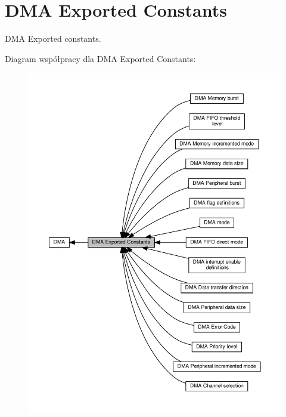 \hypertarget{group___d_m_a___exported___constants}{}\section{D\+MA Exported Constants}
\label{group___d_m_a___exported___constants}


D\+MA Exported constants.  


Diagram współpracy dla D\+MA Exported Constants\+:\nopagebreak
\begin{figure}[H]
\begin{center}
\leavevmode
\includegraphics[width=350pt]{group___d_m_a___exported___constants}
\end{center}
\end{figure}
